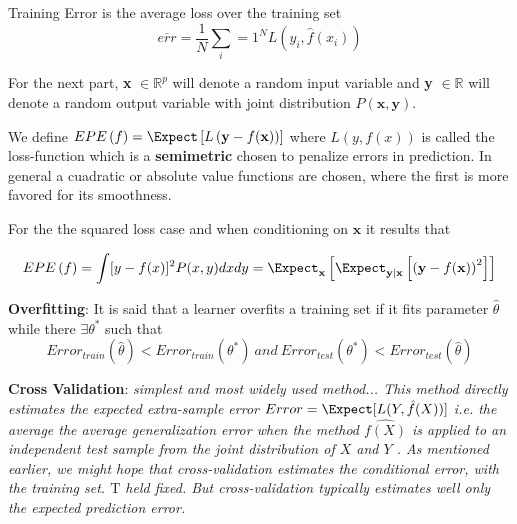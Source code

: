 \begin{definition}{Training Error}
	is the average loss over the training set
	$$ \overline{err} = \frac{1}{N} \sum_i=1^N L(y_i, \hat{f}(x_i) )$$
\end{definition}



For the next part, \textbf{x} $\in \mathbb{R}^{p}$ will denote a random input variable and \textbf{y}  $\in \mathbb{R}$ will denote a random output variable with joint distribution $P\left(\textbf{x},\textbf{y}\right)$.

We define $EPE\left(f \right) = \Expect\left[L\left(\textbf{y} - f(\textbf{x}) \right) \right] $ where $L(y,f\left(x\right))$ is called the loss-function which is a \textbf{semimetric} chosen to penalize errors in prediction. In general a cuadratic or absolute value functions are chosen, where the first is more favored for its smoothness. 

For the the squared loss case and when conditioning on $\textbf{x}$ it results that

\begin{equation} \label{eq:expectedError}
EPE\left(f \right) = \int [y - f(x)]^2 P(x,y)dxdy

\\
= \Expect_{\textbf{x}} \left[ \Expect_{\textbf{y}|\textbf{x}} \left[  \left( \textbf{y} - f(\textbf{x})  \right)^2 \right]  \right]

\end{equation}


\textbf{Overfitting}: 
It is said that a learner overfits a training set  if it fits parameter $\hat{\theta}$ while there $\exists \theta^*$ such that
\begin{equation} \label{eq:overfitting}
Error_{train}(\hat{\theta}) < Error_{train}(\theta^*) \  and \ Error_{test}(\theta^*) < Error_{test}(\hat{\theta})   
\end{equation}

\textbf{Cross Validation}:  
\textit{simplest and most widely used method... This method directly estimates the expected extra-sample error
$Error = \Expect[L(Y,\hat{f}(X))] $ i.e. the average the average generalization error when the method $\hat{f(X)}$ is applied to an independent test sample from the joint distribution of $X$ and $Y$ . As mentioned earlier, we might hope that cross-validation estimates the conditional error, with the training set. $\mathrm{T}$ held fixed. But cross-validation typically estimates well only the expected prediction error.}


